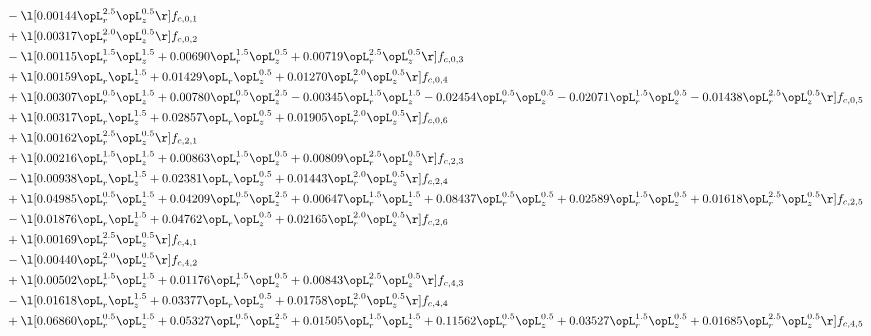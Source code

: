 \begin{alignat}{2}
& - \l[  0.00144 \opL_r^{2.5} \opL_z^{0.5}  \r] f_{c,0,1} \nonumber \\ 
& + \l[  0.00317 \opL_r^{2.0} \opL_z^{0.5}  \r] f_{c,0,2} \nonumber \\ 
& - \l[  0.00115 \opL_r^{1.5} \opL_z^{1.5} +  0.00690 \opL_r^{1.5} \opL_z^{0.5} +  0.00719 \opL_r^{2.5} \opL_z^{0.5}  \r] f_{c,0,3} \nonumber \\ 
& + \l[  0.00159 \opL_r \opL_z^{1.5} +  0.01429 \opL_r \opL_z^{0.5} +  0.01270 \opL_r^{2.0} \opL_z^{0.5}  \r] f_{c,0,4} \nonumber \\ 
& + \l[  0.00307 \opL_r^{0.5} \opL_z^{1.5} +  0.00780 \opL_r^{0.5} \opL_z^{2.5}   -0.00345 \opL_r^{1.5} \opL_z^{1.5}   -0.02454 \opL_r^{0.5} \opL_z^{0.5}   -0.02071 \opL_r^{1.5} \opL_z^{0.5}   -0.01438 \opL_r^{2.5} \opL_z^{0.5}  \r] f_{c,0,5} \nonumber \\ 
& + \l[  0.00317 \opL_r \opL_z^{1.5} +  0.02857 \opL_r \opL_z^{0.5} +  0.01905 \opL_r^{2.0} \opL_z^{0.5}  \r] f_{c,0,6} \nonumber \\ 
& + \l[  0.00162 \opL_r^{2.5} \opL_z^{0.5}  \r] f_{c,2,1} \nonumber \\ 
& + \l[  0.00216 \opL_r^{1.5} \opL_z^{1.5} +  0.00863 \opL_r^{1.5} \opL_z^{0.5} +  0.00809 \opL_r^{2.5} \opL_z^{0.5}  \r] f_{c,2,3} \nonumber \\ 
& - \l[  0.00938 \opL_r \opL_z^{1.5} +  0.02381 \opL_r \opL_z^{0.5} +  0.01443 \opL_r^{2.0} \opL_z^{0.5}  \r] f_{c,2,4} \nonumber \\ 
& + \l[  0.04985 \opL_r^{0.5} \opL_z^{1.5} +  0.04209 \opL_r^{0.5} \opL_z^{2.5} +  0.00647 \opL_r^{1.5} \opL_z^{1.5} +  0.08437 \opL_r^{0.5} \opL_z^{0.5} +  0.02589 \opL_r^{1.5} \opL_z^{0.5} +  0.01618 \opL_r^{2.5} \opL_z^{0.5}  \r] f_{c,2,5} \nonumber \\ 
& - \l[  0.01876 \opL_r \opL_z^{1.5} +  0.04762 \opL_r \opL_z^{0.5} +  0.02165 \opL_r^{2.0} \opL_z^{0.5}  \r] f_{c,2,6} \nonumber \\ 
& + \l[  0.00169 \opL_r^{2.5} \opL_z^{0.5}  \r] f_{c,4,1} \nonumber \\ 
& - \l[  0.00440 \opL_r^{2.0} \opL_z^{0.5}  \r] f_{c,4,2} \nonumber \\ 
& + \l[  0.00502 \opL_r^{1.5} \opL_z^{1.5} +  0.01176 \opL_r^{1.5} \opL_z^{0.5} +  0.00843 \opL_r^{2.5} \opL_z^{0.5}  \r] f_{c,4,3} \nonumber \\ 
& - \l[  0.01618 \opL_r \opL_z^{1.5} +  0.03377 \opL_r \opL_z^{0.5} +  0.01758 \opL_r^{2.0} \opL_z^{0.5}  \r] f_{c,4,4} \nonumber \\ 
& + \l[  0.06860 \opL_r^{0.5} \opL_z^{1.5} +  0.05327 \opL_r^{0.5} \opL_z^{2.5} +  0.01505 \opL_r^{1.5} \opL_z^{1.5} +  0.11562 \opL_r^{0.5} \opL_z^{0.5} +  0.03527 \opL_r^{1.5} \opL_z^{0.5} +  0.01685 \opL_r^{2.5} \opL_z^{0.5}  \r] f_{c,4,5} \nonumber \\ 

\end{alignat}
